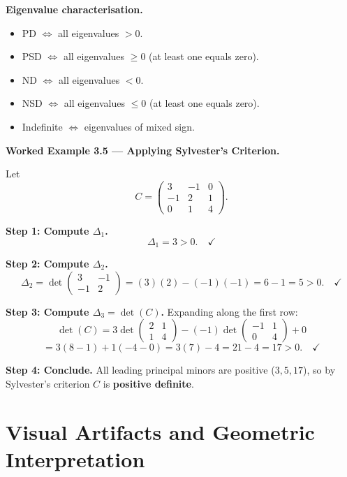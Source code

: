 \documentclass[12pt,a4paper]{article}
\begin{document}
\begin{infobox}
\textbf{Eigenvalue characterisation.}
\begin{itemize}[noitemsep]
  \item PD \(\iff\) all eigenvalues \(> 0\).
  \item PSD \(\iff\) all eigenvalues \(\geq 0\) (at least one equals zero).
  \item ND \(\iff\) all eigenvalues \(< 0\).
  \item NSD \(\iff\) all eigenvalues \(\leq 0\) (at least one equals zero).
  \item Indefinite \(\iff\) eigenvalues of mixed sign.
\end{itemize}
\end{infobox}

\medskip
\noindent\textbf{Worked Example 3.5 --- Applying Sylvester's Criterion.}

Let
\[
C = \begin{pmatrix} 3 & -1 & 0 \\ -1 & 2 & 1 \\ 0 & 1 & 4 \end{pmatrix}.
\]

\textbf{Step 1: Compute \(\Delta_1\).}
\[
\Delta_1 = 3 > 0. \quad \checkmark
\]

\textbf{Step 2: Compute \(\Delta_2\).}
\[
\Delta_2 = \det\begin{pmatrix} 3 & -1 \\ -1 & 2 \end{pmatrix}
         = (3)(2) - (-1)(-1) = 6 - 1 = 5 > 0. \quad \checkmark
\]

\textbf{Step 3: Compute \(\Delta_3 = \det(C)\).}
Expanding along the first row:
\[
\det(C) = 3\det\begin{pmatrix}2 & 1\\1 & 4\end{pmatrix}
         - (-1)\det\begin{pmatrix}-1 & 1\\0 & 4\end{pmatrix}
         + 0
\]
\[
= 3(8 - 1) + 1(-4 - 0) = 3(7) - 4 = 21 - 4 = 17 > 0. \quad \checkmark
\]

\textbf{Step 4: Conclude.}
All leading principal minors are positive (\(3, 5, 17\)), so by Sylvester's criterion
\(C\) is \textbf{positive definite}.

\section{Visual Artifacts and Geometric Interpretation}
\end{document}
